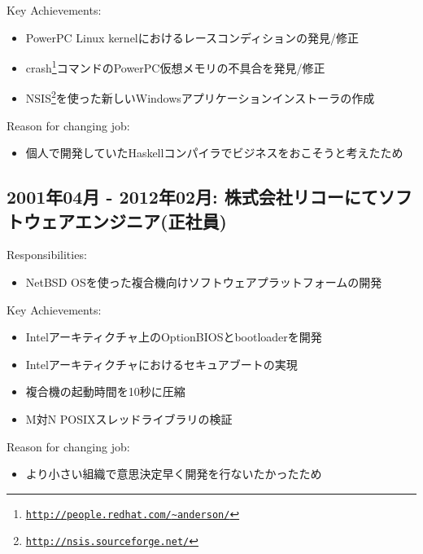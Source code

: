 \documentclass[letterpaper]{article}
\begin{document}
\noindent Key Achievements:

\begin{itemize}
  \item PowerPC Linux kernelにおけるレースコンディションの発見/修正
  \item crash\footnote{\href{http://people.redhat.com/{\textasciitilde}anderson/}{\tt http://people.redhat.com/{\textasciitilde}anderson/}}コマンドのPowerPC仮想メモリの不具合を発見/修正
  \item NSIS\footnote{\href{http://nsis.sourceforge.net/}{\tt http://nsis.sourceforge.net/}}を使った新しいWindowsアプリケーションインストーラの作成
\end{itemize}

\noindent Reason for changing job:

\begin{itemize}
  \item 個人で開発していたHaskellコンパイラでビジネスをおこそうと考えたため
\end{itemize}

\subsection*{2001年04月 - 2012年02月: 株式会社リコーにてソフトウェアエンジニア(正社員)}

\noindent Responsibilities:

\begin{itemize}
  \item NetBSD OSを使った複合機向けソフトウェアプラットフォームの開発
\end{itemize}

\noindent Key Achievements:

\begin{itemize}
  \item Intelアーキティクチャ上のOptionBIOSとbootloaderを開発
  \item Intelアーキティクチャにおけるセキュアブートの実現
  \item 複合機の起動時間を10秒に圧縮
  \item M対N POSIXスレッドライブラリの検証
\end{itemize}

\noindent Reason for changing job:

\begin{itemize}
  \item より小さい組織で意思決定早く開発を行ないたかったため
\end{itemize}
\end{document}
